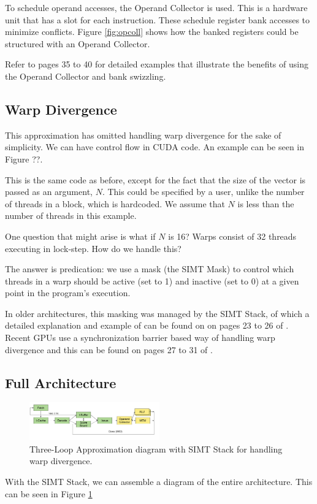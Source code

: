 To schedule operand accesses, the Operand Collector is used. This is a hardware unit that
has a slot for each instruction. These schedule register bank accesses to minimize conflicts.
Figure \ref{fig:opcoll} shows how the banked registers could be structured with an Operand Collector.

Refer to \cite{aamodt2018general} pages 35 to 40 for detailed examples that illustrate the benefits of using
the Operand Collector and bank swizzling.

\subsection{Warp Divergence}

This approximation has omitted handling warp divergence for the sake of simplicity.
We can have control flow in CUDA code. An example can be seen in Figure ??.

This is the same code as before, except for the fact that the size of the vector is passed
as an argument, $N$. This could be specified by a user, unlike the number of threads in a block,
which is hardcoded. We assume that $N$ is less than the number of threads in this example.

One question that might arise is what if $N$ is 16? Warps consist of 32 threads
executing in lock-step. How do we handle this?

The answer is predication: we use a mask (the SIMT Mask) to control which threads in a warp
should be active (set to 1) and inactive (set to 0) at a given point in the program's execution.

In older architectures, this masking was managed by the SIMT Stack, of which
a detailed explanation and example of can be found on
on pages 23 to 26 of \cite{aamodt2018general}. Recent GPUs use a synchronization barrier based
way of handling warp divergence and this can be found on pages 27 to 31 of \cite{aamodt2018general}.

\subsection{Full Architecture}


\begin{figure}[h]
    \centering
    \includegraphics[width=0.5\textwidth]{assets/3.png}
    \caption{Three-Loop Approximation diagram with SIMT Stack for handling warp divergence.}
    \label{fig:warpthreeloop}
\end{figure}

With the SIMT Stack, we can assemble a diagram of the entire architecture.
This can be seen in Figure \ref{fig:warpthreeloop} 
